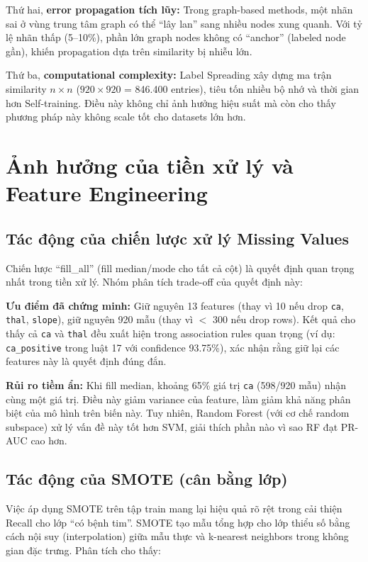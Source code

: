 Thứ hai, \textbf{error propagation tích lũy:} Trong graph-based methods, một nhãn sai ở vùng trung tâm graph có thể ``lây lan'' sang nhiều nodes xung quanh. Với tỷ lệ nhãn thấp (5--10\%), phần lớn graph nodes không có ``anchor'' (labeled node gần), khiến propagation dựa trên similarity bị nhiễu lớn.

Thứ ba, \textbf{computational complexity:} Label Spreading xây dựng ma trận similarity $n \times n$ ($920 \times 920$ = 846.400 entries), tiêu tốn nhiều bộ nhớ và thời gian hơn Self-training. Điều này không chỉ ảnh hưởng hiệu suất mà còn cho thấy phương pháp này không scale tốt cho datasets lớn hơn.

\section{Ảnh hưởng của tiền xử lý và Feature Engineering}

\subsection{Tác động của chiến lược xử lý Missing Values}

Chiến lược ``fill\_all'' (fill median/mode cho tất cả cột) là quyết định quan trọng nhất trong tiền xử lý. Nhóm phân tích trade-off của quyết định này:

\textbf{Ưu điểm đã chứng minh:} Giữ nguyên 13 features (thay vì 10 nếu drop \texttt{ca}, \texttt{thal}, \texttt{slope}), giữ nguyên 920 mẫu (thay vì $<$ 300 nếu drop rows). Kết quả cho thấy cả \texttt{ca} và \texttt{thal} đều xuất hiện trong association rules quan trọng (ví dụ: \texttt{ca\_positive} trong luật 17 với confidence 93.75\%), xác nhận rằng giữ lại các features này là quyết định đúng đắn.

\textbf{Rủi ro tiềm ẩn:} Khi fill median, khoảng 65\% giá trị \texttt{ca} (598/920 mẫu) nhận cùng một giá trị. Điều này giảm variance của feature, làm giảm khả năng phân biệt của mô hình trên biến này. Tuy nhiên, Random Forest (với cơ chế random subspace) xử lý vấn đề này tốt hơn SVM, giải thích phần nào vì sao RF đạt PR-AUC cao hơn.

\subsection{Tác động của SMOTE (cân bằng lớp)}

Việc áp dụng SMOTE trên tập train mang lại hiệu quả rõ rệt trong cải thiện Recall cho lớp ``có bệnh tim''. SMOTE \cite{chawla2002smote} tạo mẫu tổng hợp cho lớp thiểu số bằng cách nội suy (interpolation) giữa mẫu thực và k-nearest neighbors trong không gian đặc trưng. Phân tích cho thấy:

